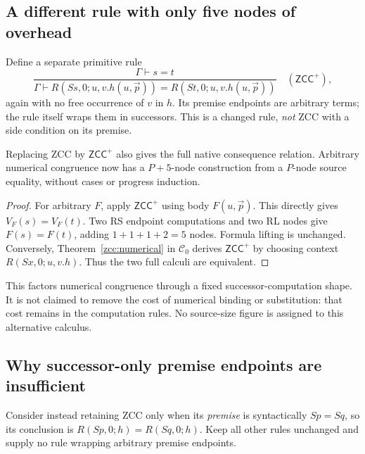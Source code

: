 \subsection{A different rule with only five nodes of overhead}

Define a separate primitive rule
\[
 \frac{\Gamma\vdash s=t}
 {\Gamma\vdash R(Ss,0;u,v.h(u,\vec p))=
                  R(St,0;u,v.h(u,\vec p))}
 \quad(\mathsf{ZCC}^{+}),
 \label{zcc:wrapped}
\]
again with no free occurrence of $v$ in $h$. Its premise endpoints are
arbitrary terms; the rule itself wraps them in successors. This is a
changed rule, \emph{not} ZCC with a side condition on its premise.

\begin{proposition}\label{zcc:wrapped-theorem}
Replacing ZCC by $\mathsf{ZCC}^{+}$ also gives the full native consequence
relation. Arbitrary numerical congruence now has a $P+5$-node construction
from a $P$-node source equality, without cases or progress induction.
\end{proposition}
\begin{proof}
For arbitrary $F$, apply $\mathsf{ZCC}^{+}$ using body $F(u,\vec p)$.
This directly gives $V_F(s)=V_F(t)$. Two RS endpoint computations and
two RL nodes give $F(s)=F(t)$, adding $1+1+1+2=5$ nodes.
Formula lifting is unchanged. Conversely, Theorem~\ref{zcc:numerical}
in $\mathcal C_0$ derives $\mathsf{ZCC}^{+}$ by choosing context
$R(Sx,0;u,v.h)$. Thus the two full calculi are equivalent.
\end{proof}

This factors numerical congruence through a fixed successor-computation
shape. It is not claimed to remove the cost of numerical binding or
substitution: that cost remains in the computation rules. No source-size
figure is assigned to this alternative calculus.

\subsection{Why successor-only premise endpoints are insufficient}

Consider instead retaining ZCC only when its \emph{premise} is syntactically
$Sp=Sq$, so its conclusion is $R(Sp,0;h)=R(Sq,0;h)$. Keep all other rules
unchanged and supply no rule wrapping arbitrary premise endpoints.

